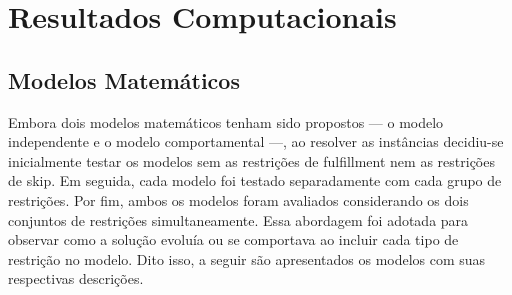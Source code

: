 
\chapter{Resultados Computacionais}

\section{Modelos Matemáticos}
Embora dois modelos matemáticos tenham sido propostos — o modelo independente e o modelo comportamental —, ao resolver as instâncias decidiu-se inicialmente testar os modelos sem as restrições de fulfillment nem as restrições de skip. Em seguida, cada modelo foi testado separadamente com cada grupo de restrições. Por fim, ambos os modelos foram avaliados considerando os dois conjuntos de restrições simultaneamente. Essa abordagem foi adotada para observar como a solução evoluía ou se comportava ao incluir cada tipo de restrição no modelo. Dito isso, a seguir são apresentados os modelos com suas respectivas descrições.
\vspace{0.5cm}

